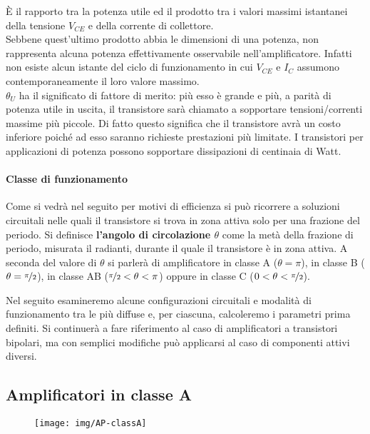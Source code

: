 È il rapporto tra la potenza utile ed il prodotto tra i valori massimi istantanei della tensione $V_{CE}$ e della corrente di collettore.\\
Sebbene quest'ultimo prodotto abbia le dimensioni di una potenza, non rappresenta alcuna potenza effettivamente osservabile nell'amplificatore. Infatti non esiste alcun istante del ciclo di funzionamento in cui $V_{CE}$ e $I_{C}$ assumono contemporaneamente il loro valore massimo.
\\
$\theta_U$ ha il significato di fattore di merito: più esso è grande e più, a parità di potenza utile in uscita, il transistore sarà chiamato a sopportare tensioni/correnti massime più piccole.
Di fatto questo significa che il transistore avrà un costo inferiore	poiché ad esso saranno richieste prestazioni più limitate. I transistori per applicazioni di	potenza possono sopportare dissipazioni di centinaia di Watt.

\paragraph{Classe di funzionamento}
Come si vedrà nel seguito per motivi di efficienza si può ricorrere a soluzioni circuitali nelle quali il transistore si trova in zona attiva solo per una frazione del periodo. Si definisce \textbf{l'angolo di circolazione $\theta$} come la metà della frazione di periodo, misurata il radianti,
durante il quale il transistore è in zona attiva. A seconda del valore di $\theta$ si parlerà di
amplificatore in classe A ($\theta = \pi$), in classe B ($\theta = \nicefrac{\pi}{2}$), in classe
AB ($\nicefrac{\pi}{2}<\theta<\pi$) oppure in classe C ($0<\theta<\nicefrac{\pi}{2}$).

Nel seguito esamineremo alcune configurazioni circuitali e modalità di funzionamento tra le più
diffuse e, per ciascuna, calcoleremo i parametri prima definiti. Si continuerà a fare riferimento al
caso di amplificatori a transistori bipolari, ma con semplici modifiche può applicarsi al caso di componenti attivi diversi.

\subsection{Amplificatori in classe A}

\begin{figure}[hbt]
\centering
\texttt{[image: img/AP-classA]}
\caption{}
\label{fig:ap-classa}
\end{figure}

